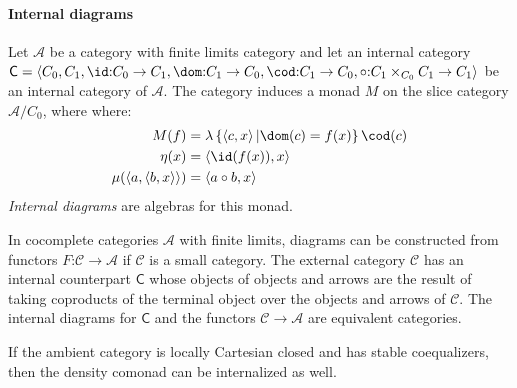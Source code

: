 \documentclass{tac}
\newcommand\cat\mathcal
\newcommand\icat\mathsf
\newcommand\of{\mathord:}
\newcommand\set[1]{\left\{#1\right\}}
\newcommand\tuplet[1]{\left\langle #1 \right\rangle}
\begin{document}
\paragraph{Internal diagrams}
\begin{definition} Let $\cat A$ be a category with finite limits category and let an internal category $\icat C = \tuplet{C_0,C_1,\id\of C_0\to C_1,\dom\of C_1\to C_0,\cod\of C_1\to C_0,\circ\of C_1\times_{C_0}C_1\to C_1}$ be an internal category of $\cat A$. 
The category induces a monad $M$ on the slice category $\cat A/C_0$, where where:
\begin{align*}
M(f) &= \lambda\set{\tuplet{c,x}| \dom(c)=f(x)}\cod(c) \\
\eta(x) &= \tuplet{\id(f(x)),x}\\
\mu(\tuplet{a,\tuplet{b,x}}) &= \tuplet{a\circ b,x}
\end{align*}
\emph{Internal diagrams} are algebras for this monad.
\end{definition}

\begin{example}
In cocomplete categories $\cat A$ with finite limits, diagrams can be constructed from functors $F\of\cat C\to\cat A$ if $\cat C$ is a small category. The external category $\cat C$ has an internal counterpart $\icat C$ whose objects of objects and arrows are the result of taking coproducts of the terminal object over the objects and arrows of $\cat C$. The internal diagrams for $\icat C$ and the functors $\cat C\to \cat A$ are equivalent categories.
\end{example}

If the ambient category is locally Cartesian closed and has stable coequalizers, then the density comonad can be internalized as well.
\end{document}

